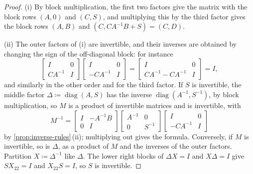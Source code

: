 \begin{proof}
(i) By block multiplication, the first two factors give the matrix with the block rows $(A,0)$ and $(C,S)$, and multiplying this by the third factor gives the block rows $(A,B)$ and $(C,CA^{-1}B+S)=(C,D)$.

(ii) The outer factors of (i) are invertible, and their inverses are obtained by changing the sign of the off-diagonal block: for instance
\[
\begin{bmatrix}I&0\\CA^{-1}&I\end{bmatrix}\begin{bmatrix}I&0\\-CA^{-1}&I\end{bmatrix}=\begin{bmatrix}I&0\\CA^{-1}-CA^{-1}&I\end{bmatrix}=I,
\]
and similarly in the other order and for the third factor. If $S$ is invertible, the middle factor $\Delta\coloneqq\operatorname{diag}(A,S)$ has the inverse $\operatorname{diag}(A^{-1},S^{-1})$, by block multiplication, so $M$ is a product of invertible matrices and is invertible, with
\[
M^{-1}=\begin{bmatrix}I&-A^{-1}B\\0&I\end{bmatrix}\begin{bmatrix}A^{-1}&0\\0&S^{-1}\end{bmatrix}\begin{bmatrix}I&0\\-CA^{-1}&I\end{bmatrix}
\]
by \cref{prop:inverse-rules}\,(ii); multiplying out gives the formula. Conversely, if $M$ is invertible, so is $\Delta$, as a product of $M$ and the inverses of the outer factors. Partition $X\coloneqq\Delta^{-1}$ like $\Delta$. The lower right blocks of $\Delta X=I$ and $X\Delta=I$ give $SX_{22}=I$ and $X_{22}S=I$, so $S$ is invertible.
\end{proof}

